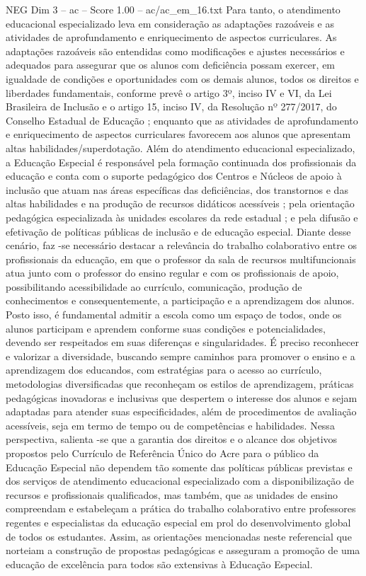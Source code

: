 \begin{textsample}{NEG Dim 3 – ac – Score 1.00 – ac/ac\_em\_16.txt}
Para tanto, o atendimento educacional especializado leva em consideração as adaptações razoáveis e as atividades de aprofundamento e enriquecimento de aspectos curriculares.
As adaptações razoáveis são entendidas como modificações e ajustes necessários e adequados para assegurar que os alunos com deficiência possam exercer, em igualdade de condições e oportunidades com os demais alunos, todos os direitos e liberdades fundamentais, conforme prevê o artigo 3º, inciso IV e VI, da Lei Brasileira de Inclusão e o artigo 15, inciso IV, da Resolução nº 277/2017, do Conselho Estadual de Educação ; enquanto que as atividades de aprofundamento e enriquecimento de aspectos curriculares favorecem aos alunos que apresentam altas habilidades/superdotação.
Além do atendimento educacional especializado, a Educação Especial é responsável pela formação continuada dos profissionais da educação e conta com o suporte pedagógico dos Centros e Núcleos de apoio à inclusão que atuam nas áreas específicas das deficiências, dos transtornos e das altas habilidades e na produção de recursos didáticos acessíveis ; pela orientação pedagógica especializada às unidades escolares da rede estadual ; e pela difusão e efetivação de políticas públicas de inclusão e de educação especial.
Diante desse cenário, faz -se necessário destacar a relevância do trabalho colaborativo entre os profissionais da educação, em que o professor da sala de recursos multifuncionais atua junto com o professor do ensino regular e com os profissionais de apoio, possibilitando acessibilidade ao currículo, comunicação, produção de conhecimentos e consequentemente, a participação e a aprendizagem dos alunos.
Posto isso, é fundamental admitir a escola como um espaço de todos, onde os alunos participam e aprendem conforme suas condições e potencialidades, devendo ser respeitados em suas diferenças e singularidades.
É preciso reconhecer e valorizar a diversidade, buscando sempre caminhos para promover o ensino e a aprendizagem dos educandos, com estratégias para o acesso ao currículo, metodologias diversificadas que reconheçam os estilos de aprendizagem, práticas pedagógicas inovadoras e inclusivas que despertem o interesse dos alunos e sejam adaptadas para atender suas especificidades, além de procedimentos de avaliação acessíveis, seja em termo de tempo ou de competências e habilidades.
Nessa perspectiva, salienta -se que a garantia dos direitos e o alcance dos objetivos propostos pelo Currículo de Referência Único do Acre para o público da Educação Especial não dependem tão somente das políticas públicas previstas e dos serviços de atendimento educacional especializado com a disponibilização de recursos e profissionais qualificados, mas também, que as unidades de ensino compreendam e estabeleçam a prática do trabalho colaborativo entre professores regentes e especialistas da educação especial em prol do desenvolvimento global de todos os estudantes.
Assim, as orientações mencionadas neste referencial que norteiam a construção de propostas pedagógicas e asseguram a promoção de uma educação de excelência para todos são extensivas à Educação Especial.

\end{textsample}

